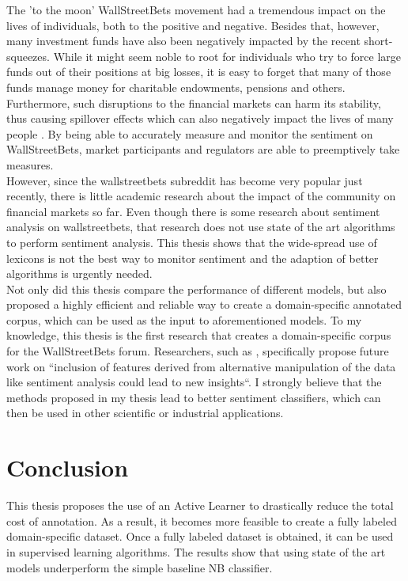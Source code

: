 \documentclass[11pt, a4paper]{article}
\begin{document}
The 'to the moon' WallStreetBets movement had a tremendous impact on the lives of individuals, both to the positive and negative. 
Besides that, however, many investment funds have also been negatively impacted by the recent short-squeezes. 
While it might seem noble to root for individuals who try to force large funds out of their positions at big losses, it is easy to forget that many 
of those funds manage money for charitable endowments, pensions and others. 
Furthermore, such disruptions to the financial markets can harm its stability, thus causing spillover effects which can also negatively impact the 
lives of many people \citep{lyocsa2021yolotrading}.
By being able to accurately measure and monitor the sentiment on WallStreetBets, market participants and regulators are able to preemptively take measures.\\
However, since the wallstreetbets subreddit has become very popular just recently, there is little academic research about the impact of the community on 
financial markets so far. Even though there is some research about sentiment analysis on wallstreetbets, that research does not use state of the art algorithms to perform 
sentiment analysis. This thesis shows that the wide-spread use of lexicons is not the best way to monitor sentiment and the adaption of better algorithms is urgently needed.\\
Not only did this thesis compare the performance of different models, but also proposed a highly efficient and reliable way to create a domain-specific annotated corpus, 
which can be used as the input to aforementioned models. To my knowledge, this thesis is the first research that creates a domain-specific corpus for the WallStreetBets forum. 
Researchers, such as \cite{talamas2021socialmediaeffectsonthemarket}, specifically propose future work on “inclusion of features derived from alternative manipulation of the data like sentiment analysis 
could lead to new insights“. I strongly believe that the methods proposed in my thesis lead to better sentiment classifiers, 
which can then be used in other scientific or industrial applications.



\section{Conclusion}
This thesis proposes the use of an Active Learner to drastically reduce the total cost of annotation. 
As a result, it becomes more feasible to create a fully labeled domain-specific dataset. 
Once a fully labeled dataset is obtained, it can be used in supervised learning algorithms. 
The results show that using state of the art models underperform the simple baseline NB classifier.
\end{document}
